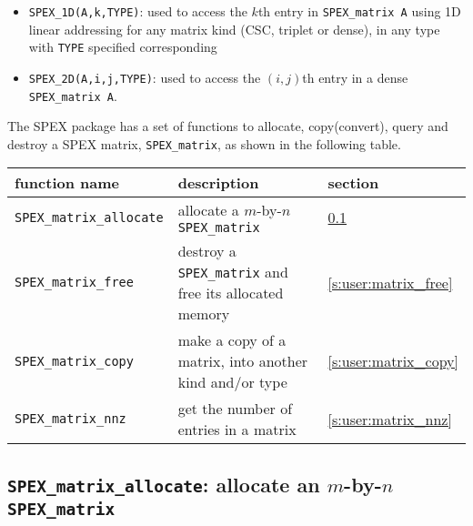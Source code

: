 \documentclass[12pt]{report}
\theoremstyle{definition}
\begin{document}
\begin{itemize}

\item
\verb|SPEX_1D(A,k,TYPE)|: used to access the $k$th entry in
                         \verb|SPEX_matrix A| using 1D linear addressing for
                         any matrix kind (CSC, triplet or dense), in any type
                         with \verb|TYPE| specified corresponding

\item
\verb|SPEX_2D(A,i,j,TYPE)|: used to access the $(i,j)$th entry in a dense
                            \verb|SPEX_matrix A|.

\end{itemize}

The SPEX package has a set of functions to allocate, copy(convert), query and
destroy a SPEX matrix, \verb|SPEX_matrix|, as shown in the following table.

{\small
\begin{center}
\begin{tabular}{lp{2.5in}l}
\hline
function name & description & section \\
\hline
\verb|SPEX_matrix_allocate|
    & allocate a $m$-by-$n$ \verb|SPEX_matrix|
    & \ref{s:user:matrix_allocate} \\
\hline
\verb|SPEX_matrix_free|
    & destroy a \verb|SPEX_matrix| and free its allocated memory
    & \ref{s:user:matrix_free} \\
\hline
\verb|SPEX_matrix_copy|
    & make a copy of a matrix, into another kind and/or type
    & \ref{s:user:matrix_copy} \\
\hline
\verb|SPEX_matrix_nnz|
    & get the number of entries in a matrix
    & \ref{s:user:matrix_nnz} \\
\hline
\end{tabular}
\end{center}
}

\cprotect\subsection{\verb|SPEX_matrix_allocate|: allocate an $m$-by-$n$
\verb|SPEX_matrix|}
\label{s:user:matrix_allocate}
\end{document}
